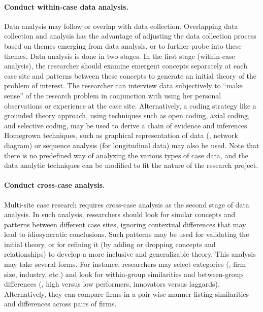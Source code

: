 \paragraph{Conduct within-case data analysis.} Data analysis may follow or overlap with data collection. Overlapping data collection and analysis has the advantage of adjusting the data collection process based on themes emerging from data analysis, or to further probe into these themes. Data analysis is done in two stages. In the first stage (within-case analysis), the researcher should examine emergent concepts separately at each case site and patterns between these concepts to generate an initial theory of the problem of interest. The researcher can interview data subjectively to ``make sense'' of the research problem in conjunction with using her personal observations or experience at the case site. Alternatively, a coding strategy like a grounded theory approach, using techniques such as open coding, axial coding, and selective coding, may be used to derive a chain of evidence and inferences. Homegrown techniques, such as graphical representation of data (\eg, network diagram) or sequence analysis (for longitudinal data) may also be used. Note that there is no predefined way of analyzing the various types of case data, and the data analytic techniques can be modified to fit the nature of the research project.

\paragraph{Conduct cross-case analysis.} Multi-site case research requires cross-case analysis as the second stage of data analysis. In such analysis, researchers should look for similar concepts and patterns between different case sites, ignoring contextual differences that may lead to idiosyncratic conclusions. Such patterns may be used for validating the initial theory, or for refining it (by adding or dropping concepts and relationships) to develop a more inclusive and generalizable theory. This analysis may take several forms. For instance, researchers may select categories (\eg, firm size, industry, etc.) and look for within-group similarities and between-group differences (\eg, high versus low performers, innovators versus laggards). Alternatively, they can compare firms in a pair-wise manner listing similarities and differences across pairs of firms.

